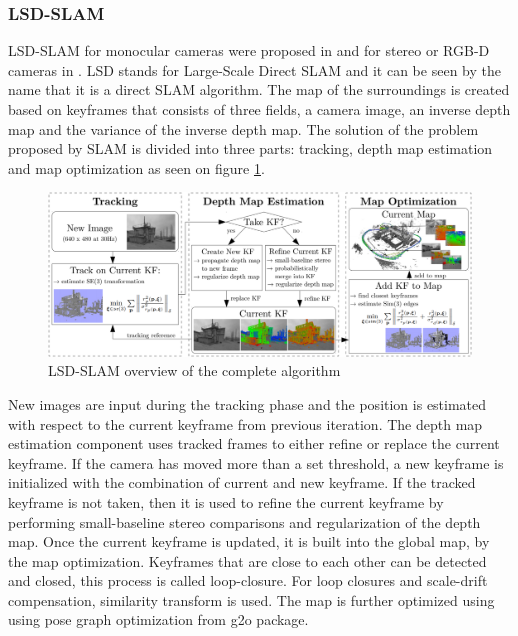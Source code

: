 \subsubsection{LSD-SLAM}

LSD-SLAM for monocular cameras were proposed in \cite{engel2014lsd} and for stereo or RGB-D cameras in \cite{engel2015large}.
LSD stands for Large-Scale Direct SLAM and it can be seen by the name that it is a direct SLAM algorithm.
The map of the surroundings is created based on keyframes that consists of three fields, a camera image, an inverse depth map
and the variance of the inverse depth map. The solution of the problem proposed by SLAM is divided into three parts: tracking,
depth map estimation and map optimization as seen on figure \ref{fig:lsd_slam_overview}.


\begin{figure}[!ht]
    \centering
    \includegraphics[width=150mm, keepaspectratio]{figures/lsd_slam_overview.png}
    \caption{LSD-SLAM overview of the complete algorithm \cite{engel2014lsd}}
    \label{fig:lsd_slam_overview}
\end{figure}

New images are input during the tracking phase and the position is estimated with respect to the current keyframe from 
previous iteration. The depth map estimation component uses tracked frames to either refine or replace the current keyframe.
If the camera has moved more than a set threshold, a new keyframe is initialized with the combination of current and new 
keyframe. If the tracked keyframe is not taken, then it is used to refine the current keyframe by performing small-baseline 
stereo comparisons and regularization of the depth map. Once the current keyframe is updated, it is built into the global map,
by the map optimization.
Keyframes that are close to each other can be detected and closed, this process is called loop-closure. For loop closures and
scale-drift compensation, similarity transform is used. The map is further optimized using using pose graph optimization from 
g2o package.


